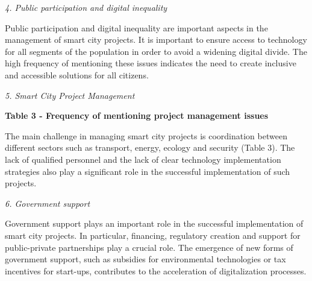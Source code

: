 {\emph{4. Public participation and digital inequality}

Public participation and digital inequality are important aspects in the
management of smart city projects. It is important to ensure access to
technology for all segments of the population in order to avoid a
widening digital divide. The high frequency of mentioning these issues
indicates the need to create inclusive and accessible solutions for all
citizens.

\emph{5. Smart City Project Management}

{\bfseries Table 3 - Frequency of mentioning project management issues}


The main challenge in managing smart city projects is coordination
between different sectors such as transport, energy, ecology and
security (Table 3). The lack of qualified personnel and the lack of
clear technology implementation strategies also play a significant role
in the successful implementation of such projects.

\emph{6. Government support}

Government support plays an important role in the successful
implementation of smart city projects. In particular, financing,
regulatory creation and support for public-private partnerships play a
crucial role. The emergence of new forms of government support, such as
subsidies for environmental technologies or tax incentives for
start-ups, contributes to the acceleration of digitalization processes.

}
